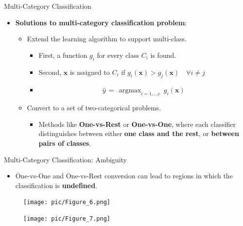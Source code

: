 \documentclass[serif, aspectratio=169]{beamer}
\DeclareMathOperator*{\argmax}{argmax}
\begin{document}
\begin{frame}{Multi-Category Classification}
    \begin{itemize}
        \item \textbf{Solutions to multi-category classification problem}:
        \medskip
        \begin{itemize}\itemsep1.5em
            \item Extend the learning algorithm to support multi-class.
            \medskip
            \begin{itemize}\itemsep1em
                \item First, a function \(g_i\) for every class \(C_i\) is found.
                \item Second, \(\mathbf{x}\) is assigned to \(C_i\) if \(g_i(\mathbf{x}) > g_j(\mathbf{x}) \quad \forall i \neq j\)
                \item[] \[\hat{y} \, = \, \argmax_{i=\text{1,...,c}} \, g_i(\mathbf{x})\]
            \end{itemize}
            \item Convert to a set of two-categorical problems.
            \medskip
            \begin{itemize}
                \item Methods like \textbf{One-vs-Rest} or \textbf{One-vs-One}, where each classifier distinguishes between either \textbf{one class and the rest}, or \textbf{between pairs of classes}.
            \end{itemize}
        \end{itemize}
    \end{itemize}
\end{frame}

\begin{frame}{Multi-Category Classification: Ambiguity}
    \begin{itemize}
        \item \justifying One-vs-One and One-vs-Rest conversion can lead to regions in which the classification is \textbf{undefined}.
    \end{itemize}
    \vfill
    \begin{figure}[bh]
        \centering
        \texttt{[image: pic/Figure\_6.png]}
    \end{figure}
    \endminipage
    \begin{figure}[bh]
        \centering
        \texttt{[image: pic/Figure\_7.png]}
    \end{figure}
    \endminipage
\end{frame}
\end{document}
